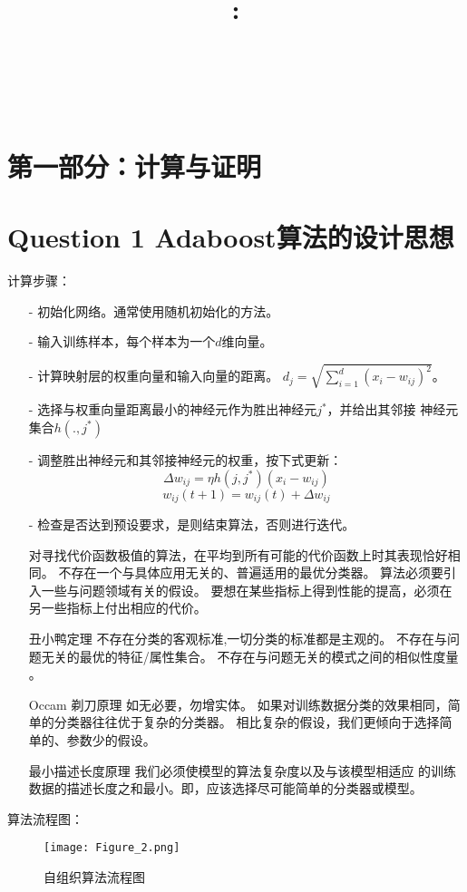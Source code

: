\documentclass{article}
\title{
    \vspace{2in}
    \textmd{\textbf{\courseName}:\homeworkTitle}\\
    \vspace{0.1in}
    \large{\studentId}\\
    \large{\studentName}\\
    \vspace{3in}
}
\newcommand{\question}[1]{\section*{Question #1}}
\begin{document}
\maketitle
\date{}
\pagebreak

\section*{第一部分：计算与证明}
\question{1 Adaboost算法的设计思想}
计算步骤：
\begin{itemize}
	\item[-] 初始化网络。通常使用随机初始化的方法。
	\item[-] 输入训练样本，每个样本为一个$d$维向量。
	\item[-] 计算映射层的权重向量和输入向量的距离。
		${d_j} = \sqrt {\sum\limits_{i = 1}^d {{{\left( {{x_i} - {w_{ij}}} \right)}^2}} } $。
	\item[-] 选择与权重向量距离最小的神经元作为胜出神经元${j^*}$，并给出其邻接
		神经元集合$h\left( {.,{j^*}} \right)$
	\item[-] 调整胜出神经元和其邻接神经元的权重，按下式更新：
	$$\Delta {w_{ij}} = \eta h\left( {j,{j^*}} \right)\left( {{x_i} - {w_{ij}}} \right)$$
	$${w_{ij}}\left( {t + 1} \right) = {w_{ij}}\left( t \right) + \Delta {w_{ij}}$$
	\item[-] 检查是否达到预设要求，是则结束算法，否则进行迭代。
\end{itemize}
\begin{itemize}
	\item[\pmb{没有免费的午餐定理}] 
	对寻找代价函数极值的算法，在平均到所有可能的代价函数上时其表现恰好相同。
	不存在一个与具体应用无关的、普遍适用的最优分类器。
	算法必须要引入一些与问题领域有关的假设。
	要想在某些指标上得到性能的提高，必须在另一些指标上付出相应的代价。
	\item[丑小鸭定理] 不存在分类的客观标准,一切分类的标准都是主观的。
	不存在与问题无关的最优的特征/属性集合。
	不存在与问题无关的模式之间的相似性度量 。
	\item[Occam 剃刀原理]如无必要，勿增实体。
	如果对训练数据分类的效果相同，简单的分类器往往优于复杂的分类器。
	相比复杂的假设，我们更倾向于选择简单的、参数少的假设。
	\item[最小描述长度原理]我们必须使模型的算法复杂度以及与该模型相适应
	的训练数据的描述长度之和最小。即，应该选择尽可能简单的分类器或模型。
\end{itemize}

算法流程图：
\begin{figure}[ht]
	\centering
	\texttt{[image: Figure\_2.png]}
	\caption{自组织算法流程图}
	\label{figl}
\end{figure}
\end{document}
